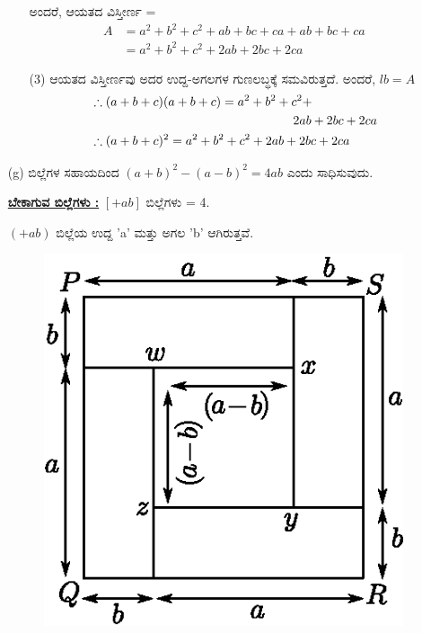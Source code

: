 \begin{enumerate}
\begin{itemize}
ಅಂದರೆ, ಆಯತದ ವಿಸ್ತೀರ್ಣ =
\begin{align*}
A & = a^2 + b^2 + c^2 + ab + bc + ca + ab + bc + ca\\
& = a^2 + b^2 + c^2 + 2ab + 2bc + 2ca
\end{align*}

\item[(3)] ಆಯತದ ವಿಸ್ತೀರ್ಣವು ಅದರ ಉದ್ದ-ಅಗಲಗಳ ಗುಣಲಬ್ಧಕ್ಕೆ ಸಮವಿರುತ್ತದೆ. 
ಅಂದರೆ, $lb = A$
\begin{align*}
& \therefore (a+b+c)(a+b+c) = a^2 + b^2 + c^2 +\\
& \hspace{5.7cm} 2ab + 2bc + 2ca\\
& \therefore (a + b + c)^2 = a^2 + b^2 + c^2 + 2ab + 2bc + 2ca
\end{align*}

\end{itemize}

\item[(g)] ಬಿಲ್ಲೆಗಳ ಸಹಾಯದಿಂದ $(a+b)^2 - (a-b)^2 = 4ab$ ಎಂದು ಸಾಧಿಸುವುದು. 

\eject

\noindent
{\textbf{\underline{ಬೇಕಾಗುವ ಬಿಲ್ಲೆಗಳು :}}} $[+ab]$ ಬಿಲ್ಲೆಗಳು = 4. 

$(+ab)$ ಬಿಲ್ಲೆಯ ಉದ್ದ 'a' ಮತ್ತು ಅಗಲ 'b' ಆಗಿರುತ್ತವೆ.
\begin{figure}[H]
\centering
\includegraphics[scale=0.8]{src/figure/chap3/fig3-33.eps}
\end{figure}


\end{enumerate}
